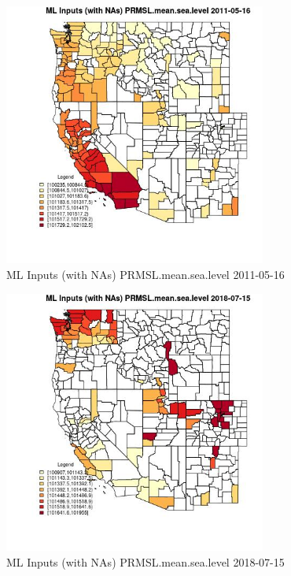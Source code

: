 \begin{figure} 
\centering  
\includegraphics[width=0.77\textwidth]{Code_Outputs/Report_ML_input_PM25_Step4_part_e_de_duplicated_aves_compiled_2019-05-20wNAs_CountyPRMSLmeansealevelMean2011-05-16.jpg} 
\caption{\label{fig:Report_ML_input_PM25_Step4_part_e_de_duplicated_aves_compiled_2019-05-20wNAsCountyPRMSLmeansealevelMean2011-05-16}ML Inputs (with NAs) PRMSL.mean.sea.level 2011-05-16} 
\end{figure} 
 

\begin{figure} 
\centering  
\includegraphics[width=0.77\textwidth]{Code_Outputs/Report_ML_input_PM25_Step4_part_e_de_duplicated_aves_compiled_2019-05-20wNAs_CountyPRMSLmeansealevelMean2018-07-15.jpg} 
\caption{\label{fig:Report_ML_input_PM25_Step4_part_e_de_duplicated_aves_compiled_2019-05-20wNAsCountyPRMSLmeansealevelMean2018-07-15}ML Inputs (with NAs) PRMSL.mean.sea.level 2018-07-15} 
\end{figure} 
 

